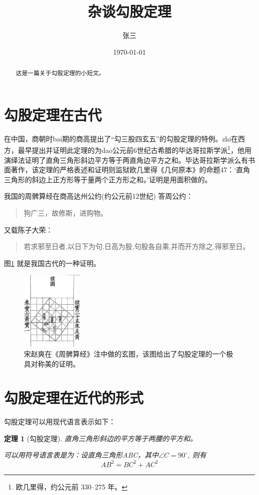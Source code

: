 \documentclass[UTF8]{ctexart}
\title{杂谈勾股定理}
\author{张三}
\date{\today}
\newtheorem{thm}{定理}
\begin{document}
	\maketitle
	\begin{abstract}
		\centering
		这是一篇关于勾股定理的小短文。
	\end{abstract}
	\tableofcontents
	\section{勾股定理在古代}\label{sec:gudai}
	在中国，商朝时bai期的商高提出了“勾三股四玄五”的勾股定理的特例。zhi在西方，最早提出并证明此定理的为dao公元前6世纪古希腊的\cite{quanjing}毕达哥拉斯学派\footnote{欧几里得，约公元前 330--275 年。}，他用演绎法证明了直角三角形斜边平方等于两直角边平方之和。毕达哥拉斯学派么有书面著作，该定理的严格表述和证明则监狱欧几里得《几何原本》的命题47：‘直角三角形的斜边上正方形等于量两个正方形之和。’证明是用面积做的。

	我国的周髀算经在商高达州公约(约公元前12世纪) 答周公约：
	\begin{quote}
		\kaishu 狗广三，故修斯，进购物。
	\end{quote}
	又载陈子大荣：
	\begin{quote}
		\kaishu 若求邪至日者,以日下为句,日高为股,句股各自乘,并而开方除之,得邪至日。
	\end{quote}
	
	图\ref{fig:xiantu} 就是我国古代的一种证明。
	\begin{figure}[ht]
		\centering
		\includegraphics[width=3cm]{zhoubi.png}
		\caption{\kaishu 宋赵爽在《周髀算经》注中做的玄图，该图给出了勾股定理的一个极具对称美的证明。}
		\label{fig:xiantu}
	\end{figure}
	
	\section{勾股定理在近代的形式}
	勾股定理可以用现代语言表示如下：
	\begin{thm}[勾股定理]
		直角三角形斜边的平方等于两腰的平方和。
		
		可以用符号语言表是为：设直角三角形ABC，其中$\angle C = 90^{\circ}$, 则有
		\begin{equation}
			AB^2 = BC^2+AC^2 \label{eq-gougu}
		\end{equation} 
	\end{thm}	
	
\end{document}
